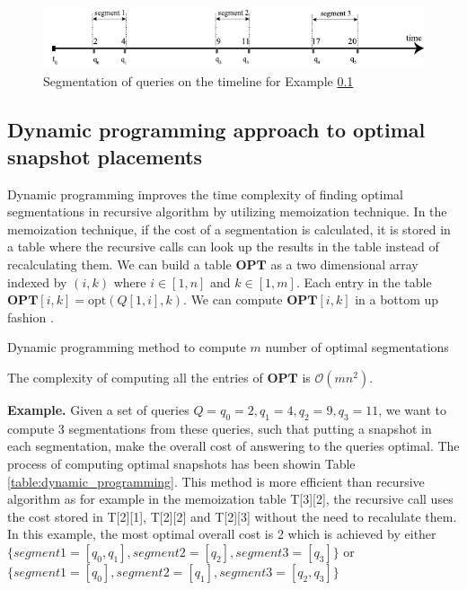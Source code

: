 \begin{figure}
	\label{fig:example_recursive_segmentation}
	\centering
	\includegraphics[width=\textwidth]{figs/example_recursive_s.pdf}
	\caption{Segmentation of queries on the timeline for Example \ref{}}
\end{figure}


\subsection{Dynamic programming approach to optimal snapshot placements}

Dynamic programming improves the time complexity of finding optimal segmentations in recursive algorithm by utilizing memoization technique. In the memoization technique, if the cost of a segmentation is calculated, it is stored in a table where the recursive calls can look up the results in the table instead of recalculating them. We can build a table $\mathbf{OPT}$ as a two dimensional array
indexed by $(i, k)$ where $i\in [1, n]$ and $k\in [1, m]$.  Each entry
in the table $\mathbf{OPT}[i,k] = \mathrm{opt}(Q[1,i], k)$.
We can compute $\mathbf{OPT}[i,k]$ in a bottom up fashion \cite{}.

\begin{algorithm}[H]
\SetAlgoLined
\caption{Dynamic programming method to compute $m$ number of optimal segmentations}
\label{alg:dynamic_programming}
\DontPrintSemicolon
 
\end{algorithm}

The complexity of computing all the entries of $\mathbf{OPT}$ is $\mathcal{O}(mn^2)$.

\textbf{Example.} Given a set of queries $Q={q_0=2,q_1=4,q_2=9,q_3=11}$, we want to compute 3 segmentations from these queries, such that putting a snapshot in each segmentation, make the overall cost of answering to the queries optimal. The process of computing optimal snapshots has been showin Table \ref{table:dynamic_programming}. This method is more efficient than recursive algorithm as for example in the memoization table T[3][2], the recursive call uses the cost stored in T[2][1], T[2][2] and T[2][3] without the need to recalulate them. In this example, the most optimal overall cost is 2 which is achieved by either $\{segment1 =[q_0,q_1],segment2=[q_2],segment3=[q_3]\}$ or $\{segment1 =[q_0], segment2 = [q_1], segment3 = [q_2, q_3]\}$

